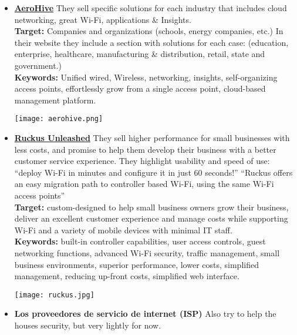 \begin{itemize}
	\item \href{http://www.aerohive.com/products/routers/br100.html}{\textbf{AeroHive}} They sell specific solutions for each industry that includes cloud networking, great Wi-Fi, applications \& Insights.\\
    \textbf{Target:} Companies and organizations (schools, energy companies, etc.) In their website they include a section with solutions for each case: (education, enterprise, healthcare, manufacturing \& distribution, retail, state and government.)\\
	\textbf{Keywords:} Unified wired, Wireless, networking, insights, self-organizing access points, effortlessly grow from a single access point, cloud-based management platform.\\
	\begin{center}
		\texttt{[image: aerohive.png]}
	\end{center}
\newpage	
	\item \href{https://www.ruckuswireless.com/products/system-management-control/unleashed}{\textbf{Ruckus Unleashed}} They sell higher performance for small businesses with less costs, and promise to help them develop their business with a better customer service experience. They highlight usability and speed of use: ``deploy Wi-Fi in minutes and configure it in just 60 seconds!'' ``Ruckus offers an easy migration path to controller based Wi-Fi, using the same Wi-Fi access points''\\
	\textbf{Target:} custom-designed to help small business owners grow their business, deliver an excellent customer experience and manage costs while supporting Wi-Fi and a variety of mobile devices with minimal IT staff.\\
	\textbf{Keywords:} built-in controller capabilities, user access controls, guest networking functions, advanced Wi-Fi security, traffic management, small business environments, superior performance, lower costs, simplified management, reducing up-front costs, simplified web interface.\\
	\begin{center}
		\texttt{[image: ruckus.jpg]}
	\end{center}
	
	\item \textbf{Los proveedores de servicio de internet (ISP)} Also try to help the houses security, but very lightly for now.
\end{itemize}

